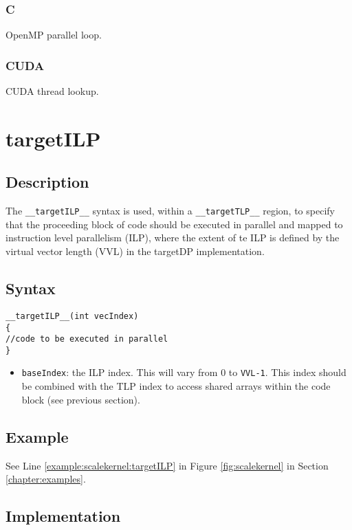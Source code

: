 \subsubsection{C}
OpenMP parallel loop.
\subsubsection{CUDA}
CUDA thread lookup.

\newpage
\section{targetILP}

\subsection{Description}

The \verb+__targetILP__+ syntax is used, within a \verb+__targetTLP__+
region, to specify that the proceeding block of code should be
executed in parallel and mapped to instruction level parallelism
(ILP), where the extent of te ILP is defined by the virtual vector length (VVL) in the targetDP implementation. 
\begin{comment}
need to document VVL in more detail somewhere and link.
\end{comment}

\subsection{Syntax}
\begin{verbatim}
__targetILP__(int vecIndex) 
{
//code to be executed in parallel
}
\end{verbatim}

\begin{itemize}
\item \verb+baseIndex+: the ILP index. This will vary from 0 to \verb+VVL-1+.  This index should be combined with the TLP index to access shared arrays within the code block (see previous section).
\end{itemize}


\subsection{Example}
See Line \ref{example:scalekernel:targetILP} in Figure \ref{fig:scalekernel} in Section \ref{chapter:examples}.

\subsection{Implementation}
